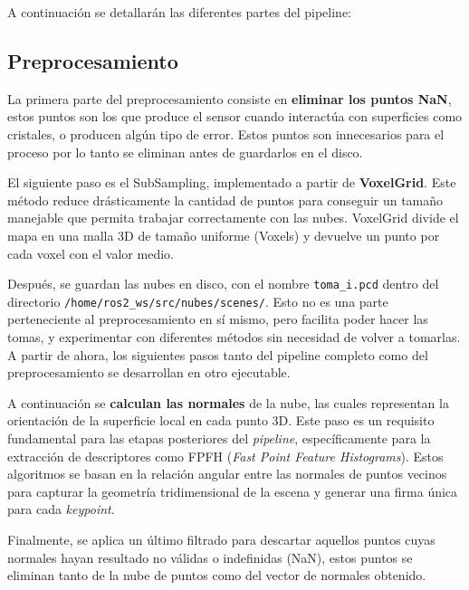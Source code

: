 \documentclass[11pt,letterpaper, onecolumn]{article}
\begin{document}
A continuación se detallarán las diferentes partes del pipeline:

\subsection{Preprocesamiento}

La primera parte del preprocesamiento consiste en \textbf{eliminar los puntos NaN}, estos puntos son los que produce el sensor cuando interactúa con superficies como cristales, o producen algún tipo de error. Estos puntos son innecesarios para el proceso por lo tanto se eliminan antes de guardarlos en el disco.

El siguiente paso es el SubSampling, implementado a partir de \textbf{VoxelGrid}. Este método reduce drásticamente la cantidad de puntos para conseguir un tamaño manejable que permita trabajar correctamente con las nubes. VoxelGrid divide el mapa en una malla 3D de tamaño uniforme (Voxels) y devuelve un punto por cada voxel con el valor medio.

Después, se guardan las nubes en disco, con el nombre \texttt{toma\_i.pcd} dentro del directorio \texttt{/home/ros2\_ws/src/nubes/scenes/}. Esto no es una parte perteneciente al preprocesamiento en sí mismo, pero facilita poder hacer las tomas, y experimentar con diferentes métodos sin necesidad de volver a tomarlas. A partir de ahora, los siguientes pasos tanto del pipeline completo como del preprocesamiento se desarrollan en otro ejecutable.

A continuación se \textbf{calculan las normales} de la nube, las cuales representan la orientación de la superficie local en cada punto 3D. Este paso es un requisito fundamental para las etapas posteriores del \textit{pipeline}, específicamente para la extracción de descriptores como FPFH (\textit{Fast Point Feature Histograms}). Estos algoritmos se basan en la relación angular entre las normales de puntos vecinos para capturar la geometría tridimensional de la escena y generar una firma única para cada \textit{keypoint}. 

Finalmente, se aplica un último filtrado para descartar aquellos puntos cuyas normales hayan resultado no válidas o indefinidas (NaN), estos puntos se eliminan tanto de la nube de puntos como del vector de normales obtenido.  
\end{document}
